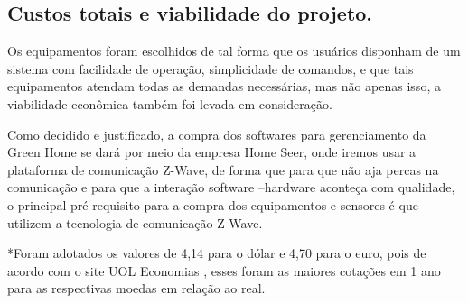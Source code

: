 \subsection{Custos totais e viabilidade do projeto.}

	Os equipamentos foram escolhidos de tal forma que os usuários disponham de um sistema com facilidade de operação, simplicidade de comandos, e que tais equipamentos atendam todas as demandas necessárias, mas não apenas isso, a viabilidade econômica também foi levada em consideração.
	
	Como decidido e justificado, a compra dos softwares para gerenciamento da Green Home se dará por meio da empresa Home Seer, onde iremos usar a plataforma de comunicação Z-Wave, de forma que para que não aja percas na comunicação e para que a interação software –hardware aconteça com qualidade, o principal pré-requisito para a compra dos equipamentos e sensores é que utilizem a tecnologia de comunicação Z-Wave.


*Foram adotados os valores de 4,14 para o dólar e 4,70 para o euro, pois de acordo com o site UOL Economias \cite{UolDolar}\cite{UolEuro}, esses foram as maiores cotações em 1 ano para as respectivas moedas em relação ao real. 



